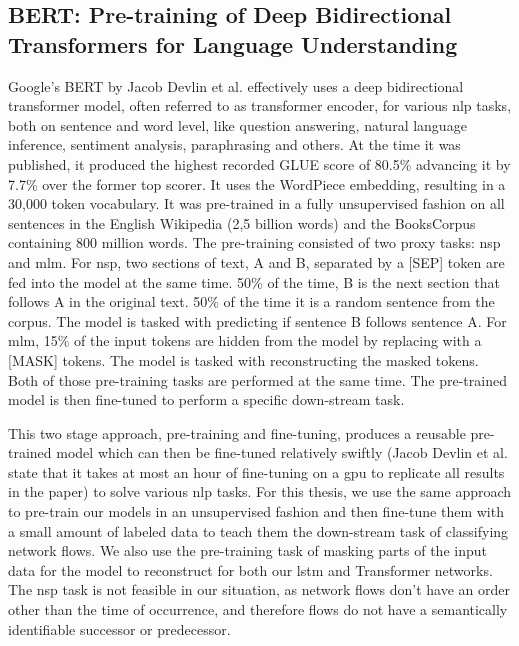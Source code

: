 \subsection{BERT: Pre-training of Deep Bidirectional Transformers for Language Understanding} \label{sec:stateofart:bert}

Google's BERT \cite{bert} by Jacob Devlin et al. effectively uses a deep bidirectional transformer model, often referred to as transformer encoder, for various \gls{nlp} tasks, both on sentence and word level, like question answering, natural language inference, sentiment analysis, paraphrasing and others. At the time it was published, it produced the highest recorded GLUE \cite{glue} score of 80.5\% advancing it by 7.7\% over the former top scorer. It uses the WordPiece \cite{wordpiece} embedding, resulting in a 30,000 token vocabulary. It was pre-trained in a fully unsupervised fashion on all sentences in the English Wikipedia (2,5 billion words) and the BooksCorpus \cite{books_corpus} containing 800 million words. The pre-training consisted of two proxy tasks: \gls{nsp} and \gls{mlm}. For \gls{nsp}, two sections of text, A and B, separated by a [SEP] token are fed into the model at the same time. 50\% of the time, B is the next section that follows A in the original text. 50\% of the time it is a random sentence from the corpus. The model is tasked with predicting if sentence B follows sentence A. For \gls{mlm}, 15\% of the input tokens are hidden from the model by replacing with a [MASK] tokens. The model is tasked with reconstructing the masked tokens. Both of those pre-training tasks are performed at the same time. The pre-trained model is then fine-tuned to perform a specific down-stream task. \par
This two stage approach, pre-training and fine-tuning, produces a reusable pre-trained model which can then be fine-tuned relatively swiftly (Jacob Devlin et al. state that it takes at most an hour of fine-tuning on a \gls{gpu} to replicate all results in the paper) to solve various \gls{nlp} tasks. For this thesis, we use the same approach to pre-train our models in an unsupervised fashion and then fine-tune them with a small amount of labeled data to teach them the down-stream task of classifying network flows. We also use the pre-training task of masking parts of the input data for the model to reconstruct for both our \gls{lstm} and Transformer networks. The \gls{nsp} task is not feasible in our situation, as network flows don't have an order other than the time of occurrence, and therefore flows do not have a semantically identifiable successor or predecessor.

